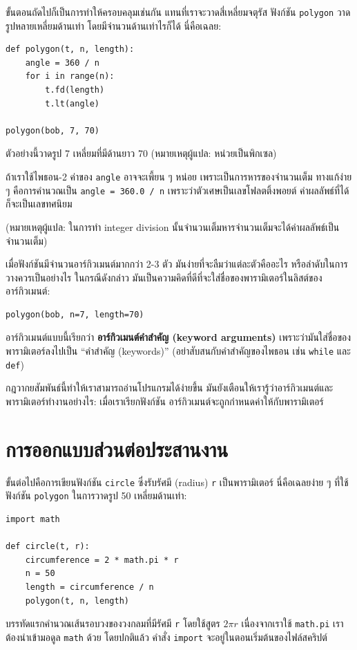 ขั้นตอนถัดไปก็เป็นการทำให้ครอบคลุมเช่นกัน แทนที่เราจะวาดสี่เหลี่ยมจตุรัส  ฟังก์ชัน {\tt polygon} 
วาดรูปหลายเหลี่ยมด้านเท่า โดยมีจำนวนด้านเท่าไรก็ได้ 
นี่คือเฉลย:

\begin{verbatim}
def polygon(t, n, length):
    angle = 360 / n
    for i in range(n):
        t.fd(length)
        t.lt(angle)

polygon(bob, 7, 70)
\end{verbatim}
%

ตัวอย่างนี้วาดรูป 7 เหลี่ยมที่มีด้านยาว 70 
(หมายเหตุผู้แปล: หน่วยเป็นพิกเซล)

ถ้าเราใช้ไพธอน-2 ค่าของ {\tt angle} อาจจะเพี้ยน ๆ หน่อย เพราะเป็นการหารของจำนวนเต็ม 
ทางแก้ง่าย ๆ คือการคำนวณเป็น {\tt angle = 360.0 / n} เพราะว่าตัวเศษเป็นเลขโฟลตติ้งพอยต์
ค่าผลลัพธ์ที่ได้ก็จะเป็นเลขทศนิยม

(หมายเหตุผู้แปล: ในการทำ integer division นั้นจำนวนเต็มหารจำนวนเต็มจะได้ค่าผลลัพธ์เป็นจำนวนเต็ม)

เมื่อฟังก์ชันมีจำนวนอาร์กิวเมนต์มากกว่า 2-3 ตัว มันง่ายที่จะลืมว่าแต่ละตัวคืออะไร 
หรือลำดับในการวางควรเป็นอย่างไร  
ในกรณีดังกล่าว มันเป็นความคิดที่ดีที่จะใส่ชื่อของพารามิเตอร์ในลิสต์ของอาร์กิวเมนต์:

\begin{verbatim}
polygon(bob, n=7, length=70)
\end{verbatim}
%
อาร์กิวเมนต์แบบนี้เรียกว่า {\bf อาร์กิวเมนต์คำสำคัญ (keyword arguments)} เพราะว่ามันใส่ชื่อของพารามิเตอร์ลงไปเป็น ``คำสำคัญ (keywords)'' (อย่าสับสนกับคำสำคัญของไพธอน เช่น 
{\tt while} และ {\tt def})

กฎวากยสัมพันธ์นี้ทำให้เราสามารถอ่านโปรแกรมได้ง่ายขึ้น 
มันยังเตือนให้เรารู้ว่าอาร์กิวเมนต์และพารามิเตอร์ทำงานอย่างไร: เมื่อเราเรียกฟังก์ชัน อาร์กิวเมนต์จะถูกกำหนดค่าให้กับพารามิเตอร์


\section{การออกแบบส่วนต่อประสานงาน} %

ขั้นต่อไปคือการเขียนฟังก์ชัน {\tt circle} ซึ่งรับรัศมี (radius) {\tt r} เป็นพารามิเตอร์
นี่คือเฉลยง่าย ๆ ที่ใช้ฟังก์ชัน {\tt polygon} ในการวาดรูป 50 เหลี่ยมด้านเท่า:

\begin{verbatim}
import math

def circle(t, r):
    circumference = 2 * math.pi * r
    n = 50
    length = circumference / n
    polygon(t, n, length)
\end{verbatim}
%
บรรทัดแรกคำนวณเส้นรอบวงของวงกลมที่มีรัศมี {\tt r} โดยใช้สูตร {\scriptsize$2 \pi r$} เนื่องจากเราใช้ {\tt math.pi}
เราต้องนำเข้ามอดูล {\tt math} ด้วย โดยปกติแล้ว คำสั่ง {\tt import} จะอยู่ในตอนเริ่มต้นของไฟล์สคริปต์

